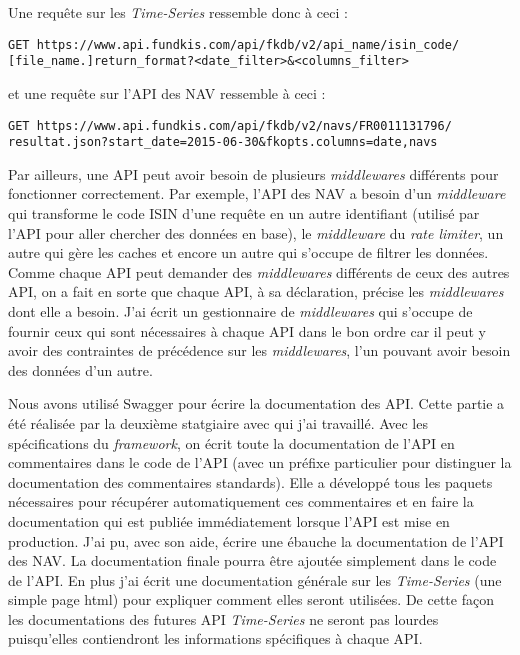 \vspace{3mm}

Une requête sur les \textit{Time-Series} ressemble donc à ceci :

\vspace{3mm}

\noindent
{\color{blue}
\texttt{GET https://www.api.fundkis.com/api/fkdb/v2/{api\_name}/{isin\_code}/} \\
\texttt{[{file\_name}.]{return\_format}?<date\_filter>\&<columns\_filter>}
}

\vspace{3mm}

et une requête sur l'API des NAV ressemble à ceci :

\vspace{3mm}

\noindent
{\color{blue}
\texttt{GET https://www.api.fundkis.com/api/fkdb/v2/navs/FR0011131796/} \\
\texttt{resultat.json?start\_date=2015-06-30\&fkopts.columns=date,navs}
}


\vspace{3mm}
Par ailleurs, une API peut avoir besoin de plusieurs \textit{middlewares} différents pour fonctionner correctement. Par exemple, l'API des NAV a besoin d'un \textit{middleware} qui transforme le code ISIN d'une requête en un autre identifiant (utilisé par l'API pour aller chercher des données en base), le \textit{middleware} du \textit{rate limiter}, un autre qui gère les caches et encore un autre qui s'occupe de filtrer les données. Comme chaque API peut demander des \textit{middlewares} différents de ceux des autres API, on a fait en sorte que chaque API, à sa déclaration, précise les \textit{middlewares} dont elle a besoin. J'ai écrit un gestionnaire de \textit{middlewares} qui s'occupe de fournir ceux qui sont nécessaires à chaque API dans le bon ordre car il peut y avoir des contraintes de précédence sur les \textit{middlewares}, l'un pouvant avoir besoin des données d'un autre.

\vspace{3mm}

Nous avons utilisé Swagger pour écrire la documentation des API. Cette partie a été réalisée par la deuxième statgiaire avec qui j'ai travaillé. Avec les spécifications du \textit{framework}, on écrit toute la documentation de l'API en commentaires dans le code de l'API (avec un préfixe particulier pour distinguer la documentation des commentaires standards). Elle a développé tous les paquets nécessaires pour récupérer automatiquement ces commentaires et en faire la documentation qui est publiée immédiatement lorsque l'API est mise en production. J'ai pu, avec son aide, écrire une ébauche la documentation de l'API des NAV. La documentation finale pourra être ajoutée simplement dans le code de l'API. En plus j'ai écrit une documentation générale sur les \textit{Time-Series} (une simple page html) pour expliquer comment elles seront utilisées. De cette façon les documentations des futures API \textit{Time-Series} ne seront pas lourdes puisqu'elles contiendront les informations spécifiques à chaque API.
